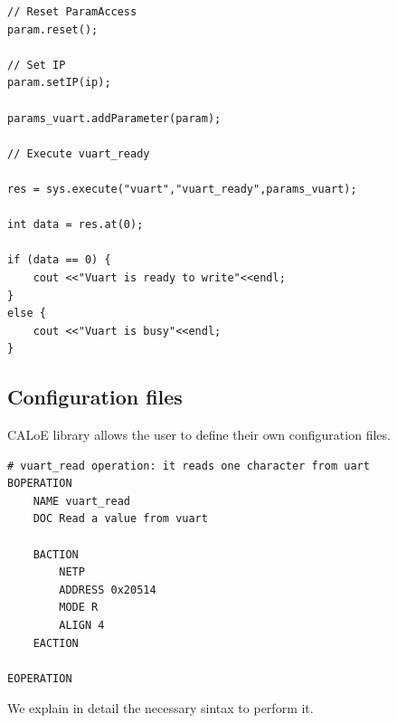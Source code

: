 \begin{lstlisting}[frame=single, label=config_file_example1b, caption=Example of CALoE API (cont)]
// Reset ParamAccess
param.reset();

// Set IP
param.setIP(ip);

params_vuart.addParameter(param);

// Execute vuart_ready

res = sys.execute("vuart","vuart_ready",params_vuart);
	 
int data = res.at(0);

if (data == 0) {
	cout <<"Vuart is ready to write"<<endl;
}
else {
	cout <<"Vuart is busy"<<endl;
}
\end{lstlisting}

\subsection{Configuration files}

CALoE library allows the user to define their own configuration files.


\begin{lstlisting}[frame=single, label=config_file_example1, caption=Example of configuration file]
# vuart_read operation: it reads one character from uart
BOPERATION
	NAME vuart_read
	DOC Read a value from vuart

	BACTION
		NETP
		ADDRESS 0x20514
		MODE R
		ALIGN 4
	EACTION

EOPERATION
\end{lstlisting}

We explain in detail the necessary sintax to perform it.

